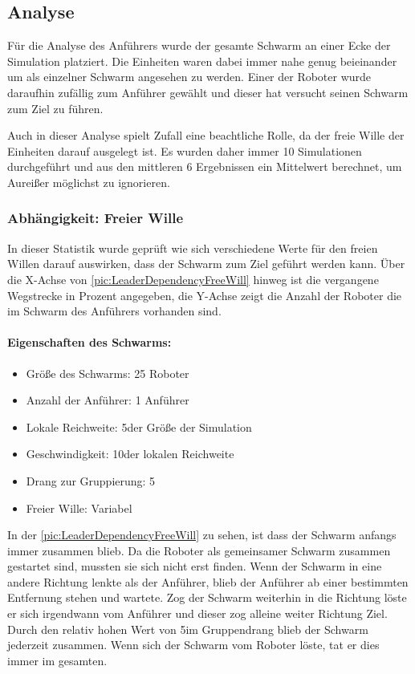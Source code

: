 \subsection*{Analyse}

Für die Analyse des Anführers wurde der gesamte Schwarm an einer Ecke der Simulation platziert. Die Einheiten waren dabei immer nahe genug beieinander um als einzelner Schwarm angesehen zu werden. Einer der Roboter wurde daraufhin zufällig zum Anführer gewählt und dieser hat versucht seinen Schwarm zum Ziel zu führen.

Auch in dieser Analyse spielt Zufall eine beachtliche Rolle, da der freie Wille der Einheiten darauf ausgelegt ist. Es wurden daher immer 10 Simulationen durchgeführt und aus den mittleren 6 Ergebnissen ein Mittelwert berechnet, um Aureißer möglichst zu ignorieren.

\subsubsection*{Abhängigkeit: Freier Wille}\label{subsubsec:AbhängigkeitFreierWille}

In dieser Statistik wurde geprüft wie sich verschiedene Werte für den freien Willen darauf auswirken, dass der Schwarm zum Ziel geführt werden kann. Über die X-Achse von \autoref{pic:LeaderDependencyFreeWill} hinweg ist die vergangene Wegstrecke in Prozent angegeben, die Y-Achse zeigt die Anzahl der Roboter die im Schwarm des Anführers vorhanden sind.

\paragraph*{Eigenschaften des Schwarms:}
\begin{itemize}
	\item Größe des Schwarms: 25 Roboter
	\item Anzahl der Anführer: 1 Anführer
	\item Lokale Reichweite: 5\per der Größe der Simulation
	\item Geschwindigkeit: 10\per der lokalen Reichweite
	\item Drang zur Gruppierung: 5\per
	\item Freier Wille: Variabel
\end{itemize}

In der \autoref{pic:LeaderDependencyFreeWill} zu sehen, ist dass der Schwarm anfangs immer zusammen blieb. Da die Roboter als gemeinsamer Schwarm zusammen gestartet sind, mussten sie sich nicht erst finden. Wenn der Schwarm in eine andere Richtung lenkte als der Anführer, blieb der Anführer ab einer bestimmten Entfernung stehen und wartete. Zog der Schwarm weiterhin in die Richtung löste er sich irgendwann vom Anführer und dieser zog alleine weiter Richtung Ziel. Durch den relativ hohen Wert von 5\per im Gruppendrang blieb der Schwarm jederzeit zusammen. Wenn sich der Schwarm vom Roboter löste, tat er dies immer im gesamten.

